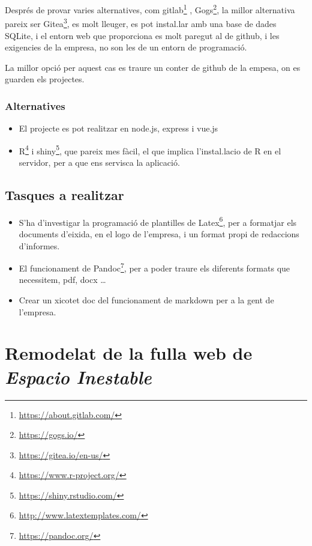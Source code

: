 \documentclass[
  10pt,
]{book}
\DeclareRobustCommand{\href}[2]{#2\footnote{\url{#1}}}
\providecommand{\tightlist}{%
  \setlength{\itemsep}{0pt}\setlength{\parskip}{0pt}}
\begin{document}
Després de provar varies alternatives, com \href{https://about.gitlab.com/}{gitlab} , \href{https://gogs.io/}{Gogs}, la millor alternativa pareix ser \href{https://gitea.io/en-us/}{Gitea}, es molt lleuger, es pot instal.lar amb una base de dades SQLite, i el entorn web que proporciona es molt paregut al de github, i les exigencies de la empresa, no son les de un entorn de programació.

La millor opció per aquest cas es traure un conter de github de la empesa, on es guarden els projectes.

\hypertarget{alternatives}{%
\subsection{Alternatives}\label{alternatives}}

\begin{itemize}
\tightlist
\item
  El projecte es pot realitzar en node.js, express i vue.js
\item
  \href{https://www.r-project.org/}{R} i \href{https://shiny.rstudio.com/}{shiny}, que pareix mes fàcil, el que implica l'instal.lacio de R en el servidor, per a que ens servisca la aplicació.
\end{itemize}

\hypertarget{tasques-a-realitzar}{%
\section{Tasques a realitzar}\label{tasques-a-realitzar}}

\begin{itemize}
\tightlist
\item
  S'ha d'investigar la programació de plantilles de \href{http://www.latextemplates.com/}{Latex}, per a formatjar els documents d'eixida, en el logo de l'empresa, i un format propi de redaccions d'informes.
\item
  El funcionament de \href{https://pandoc.org/}{Pandoc}, per a poder traure els diferents formats que necessitem, pdf, docx \ldots{}
\item
  Crear un xicotet doc del funcionament de markdown per a la gent de l'empresa.
\end{itemize}

\hypertarget{remodelat-de-la-fulla-web-de-espacio-inestable}{%
\chapter{\texorpdfstring{Remodelat de la fulla web de \emph{Espacio Inestable}}{Remodelat de la fulla web de Espacio Inestable}}\label{remodelat-de-la-fulla-web-de-espacio-inestable}}
\end{document}
